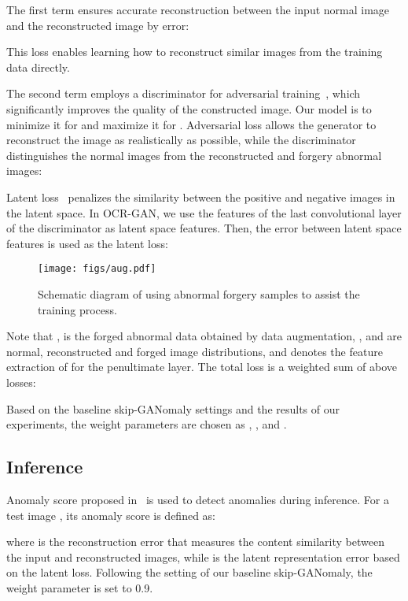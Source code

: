 \documentclass[lettersize,journal]{IEEEtran}
\begin{document}
 The first term  ensures accurate reconstruction between the input normal image  and the reconstructed image  by  error:

This loss enables learning how to reconstruct similar images from the training data directly.

 The second term  employs a discriminator  for adversarial training~\cite{goodfellow2014generative}, which significantly improves the quality of the constructed image. Our model is to minimize it for  and maximize it for . Adversarial loss allows the generator to reconstruct the image as realistically as possible, while the discriminator distinguishes the normal images from the reconstructed and forgery abnormal images:


 Latent loss~\cite{akccay2019skip} penalizes the similarity between the positive and negative images in the latent space. In OCR-GAN, we use the features of the last convolutional layer of the discriminator  as latent space features. Then, the  error between latent space features is used as the latent loss:



\begin{figure}[t]
    \centering
    \texttt{[image: figs/aug.pdf]}
    \caption{Schematic diagram of using abnormal forgery samples to assist the training process.}
    \label{fig:forgery}
\end{figure}
Note that ,  is the forged abnormal data obtained by data augmentation, ,  and  are normal, reconstructed and forged image distributions, and  denotes the feature extraction of  for the penultimate layer. The total loss  is a weighted sum of above losses:

Based on the baseline skip-GANomaly settings and the results of our experiments, the weight parameters are chosen as , , and .

\subsection{Inference}
Anomaly score proposed in~\cite{schlegl2017unsupervised} is used to detect anomalies during inference.
For a test image , its anomaly score is defined as:

where  is the reconstruction error that measures the content similarity between the input and reconstructed images, while  is the latent representation error based on the latent loss. Following the setting of our baseline skip-GANomaly, the weight parameter  is set to 0.9.
\end{document}
